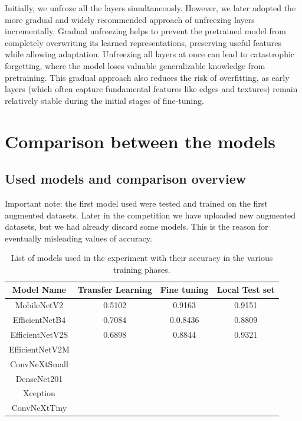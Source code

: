 \documentclass[11pt]{article}
\begin{document}
Initially, we unfroze all the layers simultaneously. However, we later adopted the more gradual and widely recommended approach of unfreezing layers incrementally. Gradual unfreezing helps to prevent the pretrained model from completely overwriting its learned representations, preserving useful features while allowing adaptation. Unfreezing all layers at once can lead to catastrophic forgetting, where the model loses valuable generalizable knowledge from pretraining. This gradual approach also reduces the risk of overfitting, as early layers (which often capture fundamental features like edges and textures) remain relatively stable during the initial stages of fine-tuning.
\section{Comparison between the models}
\subsection{Used models and comparison overview}
Important note: the first model used were tested and trained on the first augmented datasets. Later in the competition we have uploaded new augmented datasets, but we had already discard some models. This is the reason for eventually misleading values of accuracy.
\begin{table}[h!]
\centering

\begin{tabular}{|c|c|c|c|}
\hline
\textbf{Model Name} & \textbf{Transfer Learning} & \textbf{Fine tuning}& \textbf{Local Test set} \\
\hline
MobileNetV2         & 0.5102 & 0.9163 & 0.9151 \\ \hline
EfficientNetB4      & 0.7084 & 0.0.8436 & 0.8809 \\ \hline
EfficientNetV2S     & 0.6898 & 0.8844 & 0.9321 \\ \hline
EfficientNetV2M     &  &  & \\ \hline
ConvNeXtSmall       &  &  & \\ \hline
DenseNet201         &  &  & \\ \hline
Xception            &  &  & \\ \hline
ConvNeXtTiny        &  &  & \\ \hline
\end{tabular}
\caption{List of models used in the experiment with their accuracy in the various training phases.}
\end{table}
\end{document}
